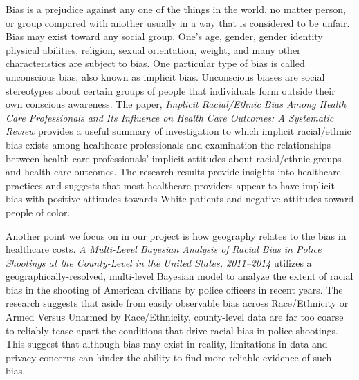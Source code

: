 \documentclass[10pt,twocolumn,letterpaper]{article}
\begin{document}

Bias is a prejudice against any one of the things in the world, no matter person, or group compared with another usually in a way that is considered to be unfair. Bias may exist toward any social group. One's age, gender, gender identity physical abilities, religion, sexual orientation, weight, and many other characteristics are subject to bias. One particular type of bias is called unconscious bias, also known as implicit bias. Unconscious biases are social stereotypes about certain groups of people that individuals form outside their own conscious awareness. The paper, \textit{Implicit Racial/Ethnic Bias Among Health Care Professionals and Its Influence on Health Care Outcomes: A Systematic Review} \cite{AMJPublicHealth1} provides a useful summary of investigation to which implicit racial/ethnic bias exists among healthcare professionals and examination the relationships between health care professionals’ implicit attitudes about racial/ethnic groups and health care outcomes. The research results provide insights into healthcare practices and suggests that most healthcare providers appear to have implicit bias with positive attitudes towards White patients and negative attitudes toward people of color.

Another point we focus on in our project is how geography relates to the bias in healthcare costs. \textit{A Multi-Level Bayesian Analysis of Racial Bias in Police Shootings at the County-Level in the United States, 2011–2014} \cite{PLOS1} utilizes a geographically-resolved, multi-level Bayesian model to analyze the extent of racial bias in the shooting of American civilians by police officers in recent years. The research suggests that aside from easily observable bias across Race/Ethnicity or Armed Versus Unarmed by Race/Ethnicity, county-level data are far too coarse to reliably tease apart the conditions that drive racial bias in police shootings. This suggest that although bias may exist in reality, limitations in data and privacy concerns can hinder the ability to find more reliable evidence of such bias.
\end{document}
